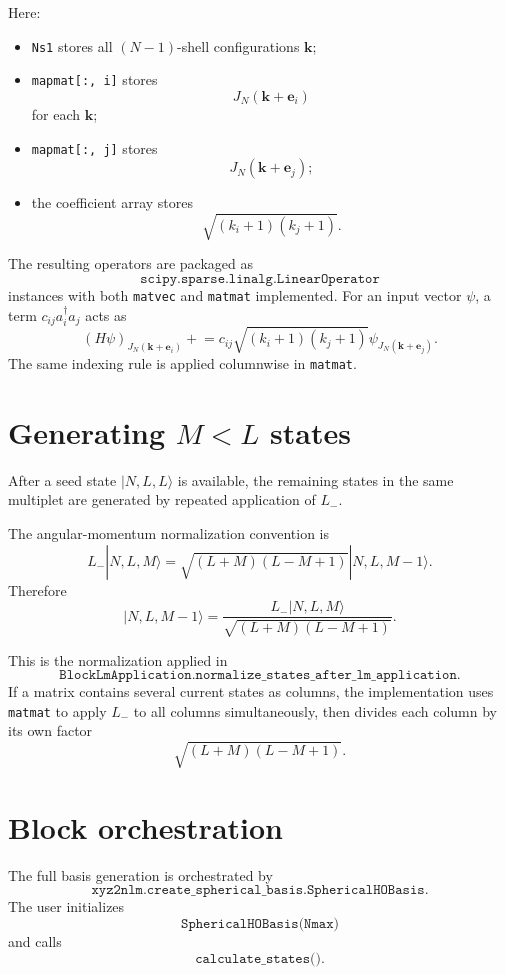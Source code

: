 \documentclass[11pt]{article}
\begin{document}
Here:

\begin{itemize}
    \item \texttt{Ns1} stores all \((N-1)\)-shell configurations
    \(\mathbf k\);
    \item \texttt{mapmat[:, i]} stores
    \[
        J_N(\mathbf k+\mathbf e_i)
    \]
    for each \(\mathbf k\);
    \item \texttt{mapmat[:, j]} stores
    \[
        J_N(\mathbf k+\mathbf e_j);
    \]
    \item the coefficient array stores
    \[
        \sqrt{(k_i+1)(k_j+1)}.
    \]
\end{itemize}

The resulting operators are packaged as
\[
    \texttt{scipy.sparse.linalg.LinearOperator}
\]
instances with both \texttt{matvec} and \texttt{matmat} implemented. For an
input vector \(\psi\), a term \(c_{ij}a_i^\dagger a_j\) acts as
\[
    (H\psi)_{J_N(\mathbf k+\mathbf e_i)}
    \mathrel{+}=
    c_{ij}\sqrt{(k_i+1)(k_j+1)}
    \psi_{J_N(\mathbf k+\mathbf e_j)}.
\]
The same indexing rule is applied columnwise in \texttt{matmat}.

\section{Generating \(M<L\) states}

After a seed state \(|N,L,L\rangle\) is available, the remaining states in the
same multiplet are generated by repeated application of \(L_-\).

The angular-momentum normalization convention is
\[
    L_-|N,L,M\rangle
    =
    \sqrt{(L+M)(L-M+1)}
    |N,L,M-1\rangle .
\]
Therefore
\[
    |N,L,M-1\rangle
    =
    \frac{
        L_-|N,L,M\rangle
    }{
        \sqrt{(L+M)(L-M+1)}
    }.
\]

This is the normalization applied in
\[
    \texttt{BlockLmApplication.normalize\_states\_after\_lm\_application}.
\]
If a matrix contains several current states as columns, the implementation
uses \texttt{matmat} to apply \(L_-\) to all columns simultaneously, then
divides each column by its own factor
\[
    \sqrt{(L+M)(L-M+1)}.
\]

\section{Block orchestration}

The full basis generation is orchestrated by
\[
    \texttt{xyz2nlm.create\_spherical\_basis.SphericalHOBasis}.
\]
The user initializes
\[
    \texttt{SphericalHOBasis(Nmax)}
\]
and calls
\[
    \texttt{calculate\_states()}.
\]
\end{document}
